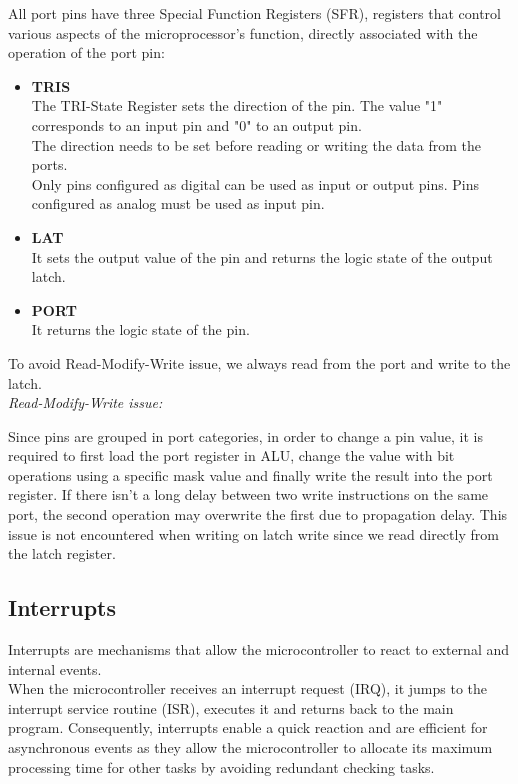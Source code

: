 \noindent
All port pins have three Special Function Registers (SFR), registers that control various aspects of the microprocessor's function, directly associated with the operation of the port pin:
\begin{itemize}
    \item \textbf{TRIS}\\
    The TRI-State Register sets the direction of the pin. The value "1" corresponds to an input pin and "0" to an output pin.\\
    The direction needs to be set before reading or writing the data from the ports. \\
    Only pins configured as digital can be used as input or output pins. Pins configured as analog must be used as input pin.
    \item \textbf{LAT}\\
    It sets the output value of the pin and returns the logic state of the output latch.
    \item \textbf{PORT}\\
    It returns the logic state of the pin. 
\end{itemize}
To avoid Read-Modify-Write issue, we always read from the port and write to the latch.\\

\noindent
\textit{Read-Modify-Write issue:}

\noindent
Since pins are grouped in port categories, in order to change a pin value, it is required to first load the port register in ALU, change the value with bit operations using a specific mask value and finally write the result into the port register. If there isn’t a long delay between two write instructions on the same port, the second operation may overwrite the first due to propagation delay. This issue is not encountered when writing on latch write since we read directly from the latch register. 

\subsection{Interrupts}

Interrupts are mechanisms that allow the microcontroller to react to external and internal events.\\
When the microcontroller receives an interrupt request (IRQ), it jumps to the interrupt service routine (ISR), executes it and returns back to the main program. 
Consequently, interrupts enable a quick reaction and are efficient for asynchronous events as they allow the microcontroller to allocate its maximum processing time for other tasks by avoiding redundant checking tasks.\\

